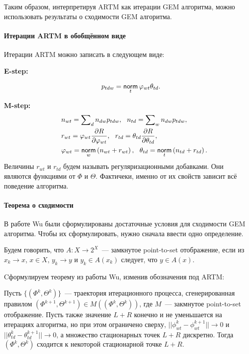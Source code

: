 \documentclass[12pt, twoside]{article}
\begin{document}
Таким образом, интерпретируя ARTM как итерации GEM алгоритма, можно использовать результаты о сходимости GEM алгоритма.

\paragraph{Итерации ARTM в обобщённом виде}
Итерации ARTM можно записать в следующем виде: 

\textbf{E-step:}   
 
\begin{equation}
\label{artm_generalE}
\begin{aligned}
\qquad& p_{tdw} = \norm_t \phi_{wt} \theta_{td}.
\end{aligned}
\end{equation}

\textbf{M-step:}
\begin{equation}
\label{artm_generalM}
\begin{aligned}
\qquad& n_{wt} = \sum\nolimits_{d} n_{dw} p_{tdw},~~n_{td} = \sum\nolimits_{w} n_{dw} p_{tdw},\\    
\qquad& r_{wt} =  \phi_{wt}\frac{\partial R}{\partial\phi_{wt}},~~ r_{td} =  \theta_{td}\frac{\partial R}{\partial\theta_{td}},\\
\qquad& \phi_{wt}  = \norm_w \left(n_{wt} + r_{wt} \right),~~\theta_{td} = \norm_t  \left(n_{td} + r_{td}\right).\\
\end{aligned}
\end{equation}
Величины $r_{wt}$ и $r_{td}$ будем называть регуляризационными добавками. Они являются функциями от $\Phi$ и $\Theta$. Фактичеки, именно от их свойств зависит всё поведение алгоритма.


\paragraph{Теорема о сходимости}
 В работе Wu \cite{wu1983convergence} были сформулированы достаточные условия для сходимости GEM алгоритма. Чтобы их сформулировать, нужно сначала ввести одно определение.
\begin{Definition}
Будем говорить, что $A\colon X \to 2^X$~--- замкнутое point-to-set отображение, если из $x_k \to x$, $x \in X$, $y_k \to y$ и $y_k \in A(x_k)$ следует, что $y \in A(x)$.
\end{Definition}

Cформулируем теорему из работы Wu, изменив обозначения под ARTM:
\begin{Theorem} \label{Theorem_wu} 
Пусть $\{(\Phi^k, \Theta^k)\}$~--- траектория итерационного процесса, сгенерированная правилом $(\Phi^{k+1}, \Theta^{k+1}) \in M((\Phi^k, \Theta^k))$, где $M$~--- закмнутое point-to-set отображение. Пусть также значение $L +  R$ конечно и не уменьшается на итерациях алгоритма, но при этом ограничено сверху, $|| \phi^k_{wt} - \phi^{k+1}_{wt}|| \to 0$ и $|| \theta^k_{td} - \theta^{k+1}_{td}||\to 0$, а множество стационарных точек $L +  R$ дискретно. Тогда $(\Phi^k, \Theta^k)$ сходится к некоторой стационарной точке $L +  R$.
\end{Theorem}
\end{document}
